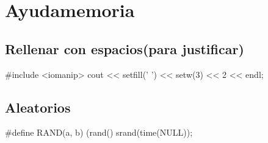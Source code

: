 \section{Ayudamemoria}%
\subsection*{Rellenar con espacios(para justificar)}
\begin{code}
#include <iomanip>
cout << setfill(' ') << setw(3) << 2 << endl;
\end{code}
\subsection*{Aleatorios}
\begin{code}
#define RAND(a, b) (rand()%
srand(time(NULL));
\end{code}
